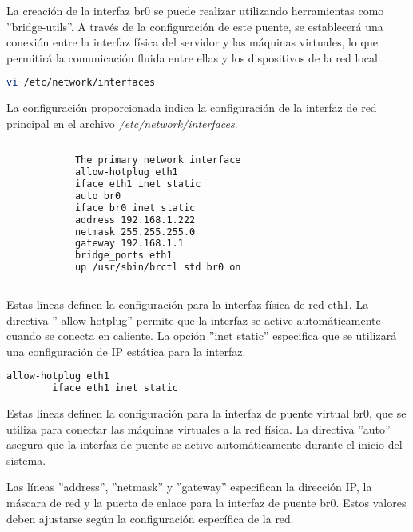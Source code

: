		La creación de la interfaz br0 se puede realizar utilizando herramientas como ''bridge-utils''. A través de la configuración de este puente, se establecerá una conexión entre la interfaz física del servidor y las máquinas virtuales, lo que permitirá la comunicación fluida entre ellas y los dispositivos de la red local.\par
	
		\begin{lstlisting}[language=Bash, caption=Interfaces]
		vi /etc/network/interfaces
		\end{lstlisting}
		
			
		La configuración proporcionada indica la configuración de la interfaz de red principal en el archivo \textit{/etc/network/interfaces}.
		
		\begin{lstlisting}[language=Bash, caption=Configuración de red]
			
			The primary network interface
			allow-hotplug eth1
			iface eth1 inet static
			auto br0
			iface br0 inet static
			address 192.168.1.222
			netmask 255.255.255.0
			gateway 192.168.1.1
			bridge_ports eth1
			up /usr/sbin/brctl std br0 on
			
		\end{lstlisting}			

		
		
		Estas líneas definen la configuración para la interfaz física de red eth1. La directiva '' allow-hotplug'' permite que la interfaz se active automáticamente cuando se conecta en caliente. La opción ''inet static'' especifica que se utilizará una configuración de IP estática para la interfaz.\par
				
		\begin{lstlisting}[language=Bash, caption=interfaz]	
		allow-hotplug eth1
		iface eth1 inet static
	    \end{lstlisting}

		Estas líneas definen la configuración para la interfaz de puente virtual br0, que se utiliza para conectar las máquinas virtuales a la red física. La directiva ''auto'' asegura que la interfaz de puente se active automáticamente durante el inicio del sistema.\par

		Las líneas ''address'', ''netmask'' y ''gateway'' especifican la dirección IP, la máscara de red y la puerta de enlace para la interfaz de puente br0. Estos valores deben ajustarse según la configuración específica de la red.\par
		
